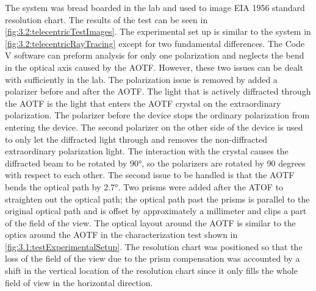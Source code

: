 The system was bread boarded in the lab and used to image EIA 1956 standard resolution chart. The results of the test can be seen in \autoref{fig:3.2:telecentricTestImages}. The experimental set up is similar to the system in \autoref{fig:3.2:telecentricRayTracing} except for two fundamental differences. The Code V software can preform analysis for only one polarization and neglects the bend in the optical axis caused by the AOTF. However, these two issues can be dealt with sufficiently in the lab. The polarization issue is removed by added a polarizer before and after the AOTF. The light that is actively diffracted through the AOTF is the light that enters the AOTF crystal on the extraordinary polarization. The polarizer before the device stops the ordinary polarization from entering the device. The second polarizer on the other side of the device is used to only let the diffracted light through and removes the non-diffracted extraordinary polarization light. The interaction with the crystal causes the diffracted beam to be rotated by 90\si{\degree}, so the polarizers are rotated by 90 degrees with respect to each other. The second issue to be handled is that the AOTF bends the optical path by 2.7\si{\degree}. Two prisms were added after the ATOF to straighten out the optical path; the optical path past the prisms is parallel to the original optical path and is offset by approximately a millimeter and clips a part of the field of the view. The optical layout around the AOTF is similar to the optics around the AOTF in the characterization test shown in \autoref{fig:3.1:testExperimentalSetup}. The resolution chart was positioned so that the loss of the field of the view due to the prism compensation was accounted by a shift in the vertical location of the resolution chart since it only fills the whole field of view in the horizontal direction.

